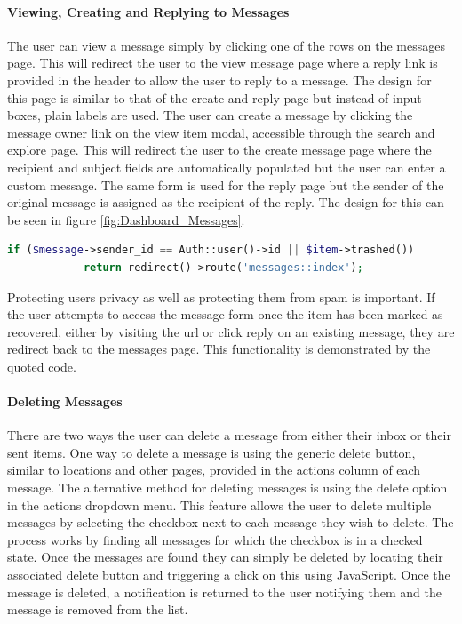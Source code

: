 \paragraph{Viewing, Creating and Replying to Messages}
The user can view a message simply by clicking one of the rows on the messages page. This will redirect the user to the view message page where a reply link is provided in the header to allow the user to reply to a message. The design for this page is similar to that of the create and reply page but instead of input boxes, plain labels are used. The user can create a message by clicking the message owner link on the view item modal, accessible through the search and explore page. This will redirect the user to the create message page where the recipient and subject fields are automatically populated but the user can enter a custom message. The same form is used for the reply page but the sender of the original message is assigned as the recipient of the reply. The design for this can be seen in figure \ref{fig:Dashboard_Messages}.

\begin{lstlisting}[language=php]
	if ($message->sender_id == Auth::user()->id || $item->trashed())
            return redirect()->route('messages::index');
\end{lstlisting}

Protecting users privacy as well as protecting them from spam is important. If the user attempts to access the message form once the item has been marked as recovered, either by visiting the url or click reply on an existing message, they are redirect back to the messages page. This functionality is demonstrated by the quoted code.

\paragraph{Deleting Messages}
There are two ways the user can delete a message from either their inbox or their sent items. One way to delete a message is using the generic delete button, similar to locations and other pages, provided in the actions column of each message. The alternative method for deleting messages is using the delete option in the actions dropdown menu. This feature allows the user to delete multiple messages by selecting the checkbox next to each message they wish to delete. The process works by finding all messages for which the checkbox is in a checked state. Once the messages are found they can simply be deleted by locating their associated delete button and triggering a click on this using JavaScript. Once the message is deleted, a notification is returned to the user notifying them and the message is removed from the list.

